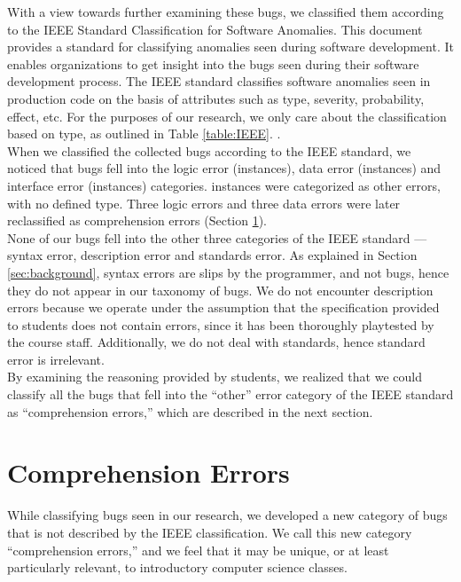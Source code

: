 \documentclass{sig-alternate}
\begin{document}
With a view towards further examining these bugs, we classified them according to the IEEE Standard Classification for Software Anomalies. This document provides a standard for classifying anomalies seen during software development. It enables organizations to get insight into the bugs seen during their software development process. The IEEE standard classifies software anomalies seen in production code on the basis of attributes such as type, severity, probability, effect, etc. For the purposes of our research, we only care about the classification based on type, as outlined in Table \ref{table:IEEE}. \cite{IEEE10}.\\

When we classified the collected bugs according to the IEEE standard, we noticed that bugs fell into the logic error (\numlogicIEEE instances), data error (\numdataIEEE instances) and interface error (\numinterfaceIEEE instances) categories. \numotherIEEE instances were categorized as other errors, with no defined type. Three logic errors and three data errors were later reclassified as comprehension errors (Section \ref{sec:comprehension}).\\

None of our bugs fell into the other three categories of the IEEE standard --- syntax error, description error and standards error. As explained in Section \ref{sec:background}, syntax errors are slips by the programmer, and not bugs, hence they do not appear in our taxonomy of bugs. We do not encounter description errors because we operate under the assumption that the specification provided to students does not contain errors, since it has been thoroughly playtested by the course staff. Additionally, we do not deal with standards, hence standard error is irrelevant.\\

By examining the reasoning provided by students, we realized that we could classify all the bugs that fell into the ``other'' error category of the IEEE standard as ``comprehension errors,'' which are described in the next section.

\section{Comprehension Errors}
\label{sec:comprehension}

While classifying bugs seen in our research, we developed a new category of bugs that is not described by the IEEE classification. We call this new category ``comprehension errors,'' and we feel that it may be unique, or at least particularly relevant, to introductory computer science classes.\\
\end{document}
